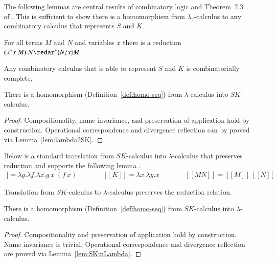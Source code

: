 \documentclass{llncs}
\def\ltrans{[\![}
\def\rtrans{]\!]}
\renewcommand{\rew}{\redar}
\begin{document}
The following lemmas are central results of combinatory logic
\cite{Curry58combinatorylogic} and Theorem~2.3 of \cite{JayGW11}. This is sufficient
to show there is a homomorphism from $\lambda_v$-calculus to any combinatory calculus 
that represents $S$ and $K$.

\begin{lemma}
\label{lem:beta*}
For all terms $M$ and $N$ and variables $x$ there is a reduction
$(\lambda ^*x.M)~N \rew^* \{N/x\}M$.
\end{lemma}

\begin{lemma}
\label{lem:lambda2SK}
  Any combinatory calculus that is able to represent $S$ and $K$
  is combinatorially complete.
\end{lemma}


\begin{theorem}
\label{thm:lambda2SK}
There is a homomorphism (Definition~\ref{def:homo-seq}) from $\lambda$-calculus into $SK$-calculus.
\end{theorem}
\begin{proof}
Compositionality, name invariance, and preservation of application hold by construction.
Operational correspondence and divergence reflection can by proved via Lemma~\ref{lem:lambda2SK}.
\end{proof}


Below is a standard translation from $SK$-calculus into $\lambda$-calculus that
preserves reduction and supports the following lemma \cite{Curry58combinatorylogic,Barendregt85}.
\begin{eqnarray*}
\ltrans S\rtrans = \lambda g.\lambda f.\lambda x.g~x~(f~x)&\qquad\quad
\ltrans K\rtrans = \lambda x.\lambda y.x\qquad\quad&
\ltrans MN \rtrans = \ltrans M\rtrans~\ltrans N\rtrans
\end{eqnarray*}



\begin{lemma}
\label{lem:SKinLambda}
Translation from $SK$-calculus to $\lambda$-calculus preserves the reduction relation.
\end{lemma}

\begin{theorem}
\label{thm:SK2lambda}
There is a homomorphism (Definition~\ref{def:homo-seq}) from $SK$-calculus into $\lambda$-calculus.
\end{theorem}
\begin{proof}Compositionality and preservation of application hold by construction. Name invariance is trivial.
Operational correspondence and divergence reflection are proved via Lemma~\ref{lem:SKinLambda}.
\end{proof}
\end{document}
